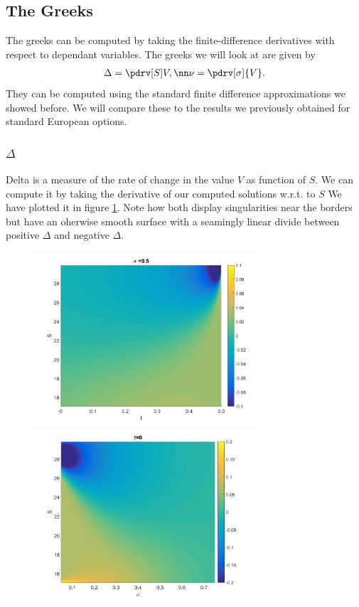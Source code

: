   \subsection{The Greeks}
  The greeks can be computed by taking the finite-difference derivatives with respect to dependant variables.
  The greeks we will look at are given by
  \begin{align}
    \Delta = \pdrv[S]V,\nn
    \nu = \pdrv[\sigma]{V}.
  \end{align}
  They can be computed using the standard finite difference approximations we showed before. We will compare these to the results we previously obtained for standard European options.
  \subsubsection{$\Delta$}
  Delta is a measure of the rate of change in the value $V$ as function of $S$. We can compute it by taking the derivative of our computed solutions w.r.t. to $S$
  We have plotted it in figure \ref{fig:delta}. Note how both display singularities near the borders but have an oherwise smooth surface with a seamingly linear divide between positive $\Delta$ and negative $\Delta$.
  \begin{figure}[hhp!]
    \caption{}
    \label{fig:delta}
    \centering
      \includegraphics[width=0.75\textwidth]{plots/delta_field}
      \includegraphics[width=0.75\textwidth]{plots/delta_sigma_field}
  \end{figure}
